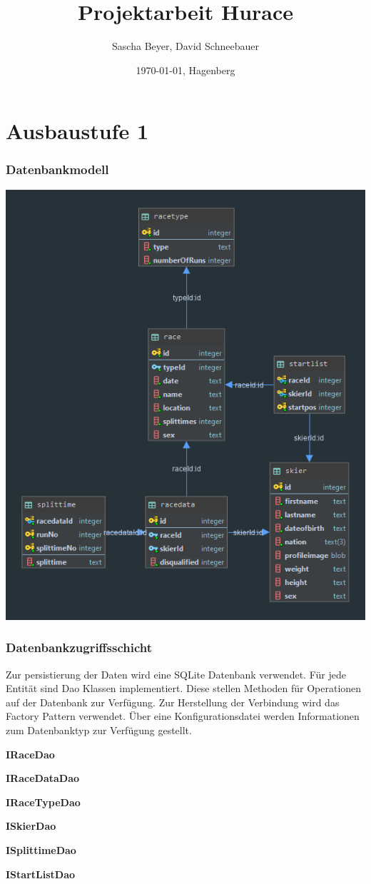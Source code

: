 \documentclass[a4paper, 12pt]{article}
\title{Projektarbeit Hurace}
\author{Sascha Beyer, David Schneebauer}
\date{\today{}, Hagenberg}
\begin{document}
	\maketitle
	\tableofcontents
	\newpage
	\section{Ausbaustufe 1}
	\subsubsection{Datenbankmodell}

	\includegraphics[width=.7\textwidth]{img/huraceDB.png}
	\newpage
	\subsubsection{Datenbankzugriffsschicht}
	
	Zur persistierung der Daten wird eine SQLite Datenbank verwendet.
	Für jede Entität sind Dao Klassen implementiert. Diese stellen Methoden für Operationen auf der Datenbank zur Verfügung. Zur Herstellung der Verbindung wird das Factory Pattern verwendet. Über eine Konfigurationsdatei werden Informationen zum Datenbanktyp zur Verfügung gestellt.
	 
	\textbf{IRaceDao}
	
	\textbf{IRaceDataDao}
	
	\textbf{IRaceTypeDao}
	
	\textbf{ISkierDao}
	
	\textbf{ISplittimeDao}
	
	\textbf{IStartListDao}
	
	
	

	\newpage	
\end{document}
